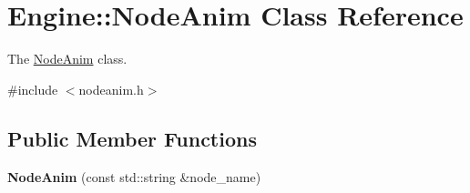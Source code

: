 \hypertarget{classEngine_1_1NodeAnim}{}\section{Engine\+:\+:Node\+Anim Class Reference}
\label{classEngine_1_1NodeAnim}


The \hyperlink{classEngine_1_1NodeAnim}{Node\+Anim} class.  




{\ttfamily \#include $<$nodeanim.\+h$>$}

\subsection*{Public Member Functions}
\begin{DoxyCompactItemize}
\item 
\hypertarget{classEngine_1_1NodeAnim_a8cfaab7c17ad0c7212904838e8730e5b}{}{\bfseries Node\+Anim} (const std\+::string \&node\+\_\+name)\label{classEngine_1_1NodeAnim_a8cfaab7c17ad0c7212904838e8730e5b}


\end{DoxyCompactItemize}
